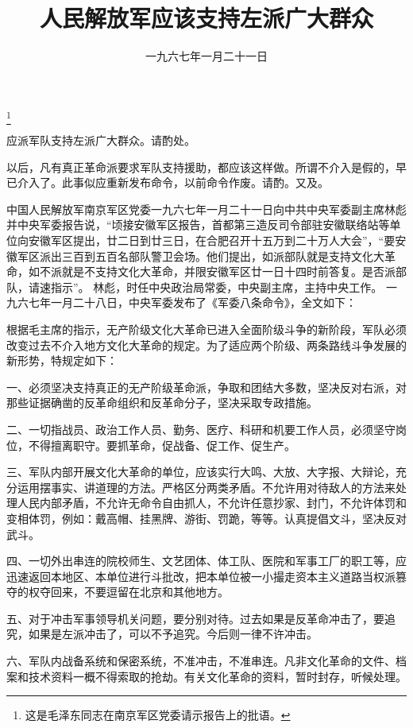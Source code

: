 
\title{人民解放军应该支持左派广大群众}
\date{一九六七年一月二十一日}
\thanks{这是毛泽东同志在南京军区党委请示报告上的批语。}
\maketitle



应派军队支持左派广大群众。请酌处。

以后，凡有真正革命派要求军队支持援助，都应该这样做。所谓不介入是假的，早已介入了。此事似应重新发布命令，以前命令作废。请酌。又及。

\begin{maonote}
中国人民解放军南京军区党委一九六七年一月二十一日向中共中央军委副主席林彪并中央军委报告说，“顷接安徽军区报告，首都第三造反司令部驻安徽联络站等单位向安徽军区提出，廿二日到廿三日，在合肥召开十五万到二十万人大会”，“要安徽军区派出三百到五百名部队警卫会场。他们提出，如派部队就是支持文化大革命，如不派就是不支持文化大革命，并限安徽军区廿一日十四时前答复。是否派部队，请速指示”。
林彪，时任中央政治局常委，中央副主席，主持中央工作。
一九六七年一月二十八日，中央军委发布了《军委八条命令》，全文如下：

根据毛主席的指示，无产阶级文化大革命已进入全面阶级斗争的新阶段，军队必须改变过去不介入地方文化大革命的规定。为了适应两个阶级、两条路线斗争发展的新形势，特规定如下：

一、必须坚决支持真正的无产阶级革命派，争取和团结大多数，坚决反对右派，对那些证据确凿的反革命组织和反革命分子，坚决采取专政措施。

二、一切指战员、政治工作人员、勤务、医疗、科研和机要工作人员，必须坚守岗位，不得擅离职守。要抓革命，促战备、促工作、促生产。

三、军队内部开展文化大革命的单位，应该实行大鸣、大放、大字报、大辩论，充分运用摆事实、讲道理的方法。严格区分两类矛盾。不允许用对待敌人的方法来处理人民内部矛盾，不允许无命令自由抓人，不允许任意抄家、封门，不允许体罚和变相体罚，例如：戴高帽、挂黑牌、游街、罚跪，等等。认真提倡文斗，坚决反对武斗。

四、一切外出串连的院校师生、文艺团体、体工队、医院和军事工厂的职工等，应迅速返回本地区、本单位进行斗批改，把本单位被一小撮走资本主义道路当权派篡夺的权夺回来，不要逗留在北京和其他地方。

五、对于冲击军事领导机关问题，要分别对待。过去如果是反革命冲击了，要追究，如果是左派冲击了，可以不予追究。今后则一律不许冲击。

六、军队内战备系统和保密系统，不准冲击，不准串连。凡非文化革命的文件、档案和技术资料一概不得索取的抢劫。有关文化革命的资料，暂时封存，听候处理。


\end{maonote}
